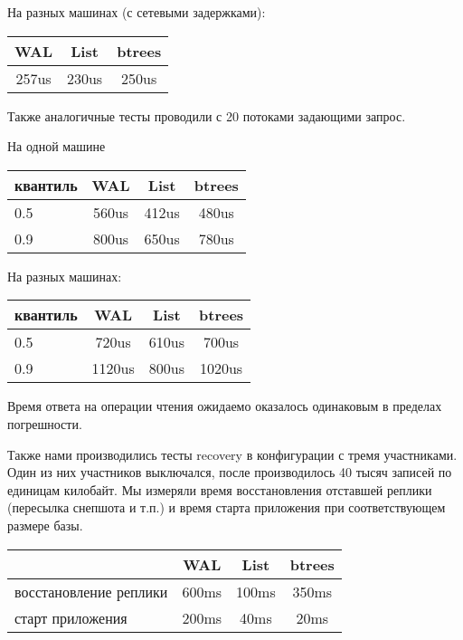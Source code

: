 \documentclass[pdftex,ptm,12pt,a4paper]{report}
\theoremstyle{definition}
\begin{document}
На разных машинах (с сетевыми задержками):
\begin{center}
\begin{tabular} {|c c c|}
\hline
    WAL & List & btrees \\
    \hline
257us & 230us & 250us \\
\hline
\end{tabular}
\end{center}

Также аналогичные тесты проводили с 20 потоками задающими запрос.

На одной машине

\begin{center}
\begin{tabular} {|l |c c c|}
\hline
квантиль & WAL & List & btrees \\
\hline
0.5 & 560us & 412us & 480us \\
0.9 & 800us & 650us & 780us \\
\hline
\end{tabular}
\end{center}

На разных машинах:

\begin{center}
\begin{tabular} {|l |c c c|}
\hline
квантиль & WAL & List & btrees \\
\hline
0.5 & 720us & 610us & 700us \\
0.9 & 1120us & 800us & 1020us \\
\hline
\end{tabular}
\end{center}

Время ответа на операции чтения ожидаемо оказалось одинаковым в пределах погрешности.

Также нами производились тесты recovery в конфигурации с тремя участниками.
Один из них участников выключался, после производилось 40 тысяч записей по единицам килобайт.
Мы измеряли время восстановления отставшей реплики (пересылка снепшота и т.п.) и время старта приложения при соответствующем размере базы.

\begin{center}
\begin{tabular} {|l |c c c|}
\hline
 & WAL & List & btrees \\
\hline
восстановление реплики & 600ms & 100ms & 350ms \\
старт приложения & 200ms & 40ms & 20ms \\
\hline
\end{tabular}
\end{center}
\end{document}
